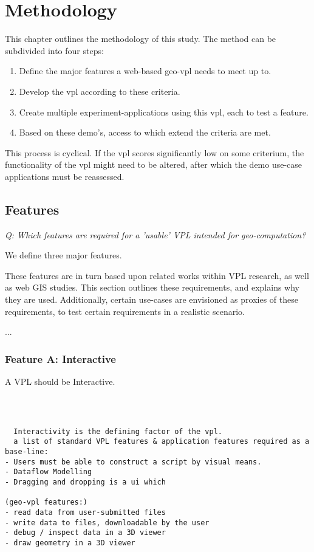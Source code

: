 \chapter{Methodology}
This chapter outlines the methodology of this study. 
The method can be subdivided into four steps:

\begin{enumerate}[(1)]
  \item Define the major features a web-based geo-vpl needs to meet up to.
  \item Develop the vpl according to these criteria.
  \item Create multiple experiment-applications using this vpl, each to test a feature.
  \item Based on these demo's, access to which extend the criteria are met.  
\end{enumerate}

This process is cyclical.
If the vpl scores significantly low on some criterium, the functionality of the vpl might need to be altered, after which the demo use-case applications must be  reassessed. 

\section{Features}

\emph{Q: Which features are required for a 'usable' VPL intended for geo-computation?}

We define three major features.  

These features are in turn based upon related works within VPL research, as well as web GIS studies. 
This section outlines these requirements, and explains why they are used. 
Additionally, certain use-cases are envisioned as proxies of these requirements, to test certain requirements in a realistic scenario. 

...

\subsection*{Feature A: Interactive}

A VPL should be Interactive.

\begin{lstlisting}



  Interactivity is the defining factor of the vpl. 
  a list of standard VPL features & application features required as a base-line:  
- Users must be able to construct a script by visual means.
- Dataflow Modelling
- Dragging and dropping is a ui which

(geo-vpl features:)
- read data from user-submitted files
- write data to files, downloadable by the user  
- debug / inspect data in a 3D viewer
- draw geometry in a 3D viewer

\end{lstlisting}


